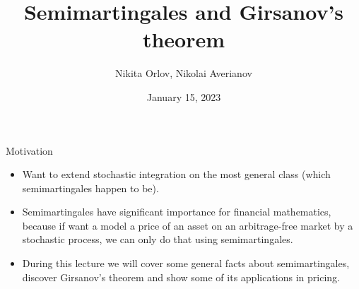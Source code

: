 \documentclass{beamer}%
\title{Semimartingales and Girsanov's theorem}
\author[Nikita Orlov, Nikolai Averianov]{Nikita Orlov, Nikolai Averianov}
\institute[HSE FES Probability Theory Club]{HSE FES Probability Theory Club}
\date{January 15, 2023}
\theoremstyle{definition}
\begin{document}
	
\begin{frame}
\titlepage
\end{frame}







\begin{frame}{Motivation}
\begin{itemize}
    \item Want to extend stochastic integration on the most general class (which semimartingales happen to be).

    \item Semimartingales have significant importance for financial mathematics, because if want a model a price of an asset on an arbitrage-free market by a stochastic process, we can only do that using semimartingales.

    \item During this lecture we will cover some general facts about semimartingales, discover Girsanov's theorem and show some of its applications in pricing.
    
\end{itemize}
\end{frame}
\end{document}
